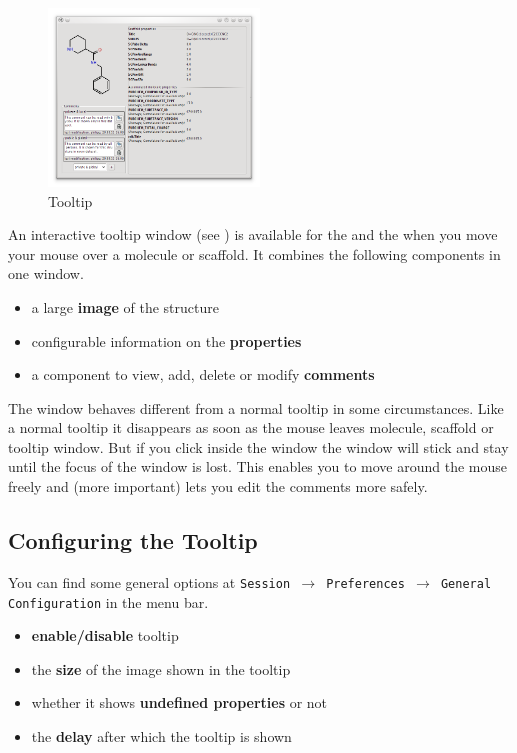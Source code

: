 \begin{figure}[!htb]
   \centering
   \includegraphics[width=0.5\textwidth]{images/sh_tooltip_dialog.png}
   \caption{Tooltip}
   \label{fig:tooltip}
\end{figure}
An interactive tooltip window (see ) is available for the \stview and the \dview when you move your mouse over a molecule or scaffold. It combines the following components in one window. 
\begin{itemize}
 \item a large \textbf{image} of the structure
 \item configurable information on the \textbf{properties}
 \item a component to view, add, delete or modify \textbf{comments}
\end{itemize}
The window behaves different from a normal tooltip in some circumstances. Like a normal tooltip it disappears as soon as the mouse leaves molecule, scaffold or tooltip window. But if you click inside the window the window will stick and stay until the focus of the window is lost. This enables you to move around the mouse freely and (more important) lets you edit the comments more safely.

\subsection{Configuring the Tooltip}
You can find some general options at \texttt{Session $\rightarrow$ Preferences $\rightarrow$ General Configuration} in the menu bar. 
\begin{itemize}
 \item \textbf{enable/disable} tooltip
 \item the \textbf{size} of the image shown in the tooltip
 \item whether it shows \textbf{undefined properties} or not
 \item the \textbf{delay} after which the tooltip is shown
\end{itemize}


